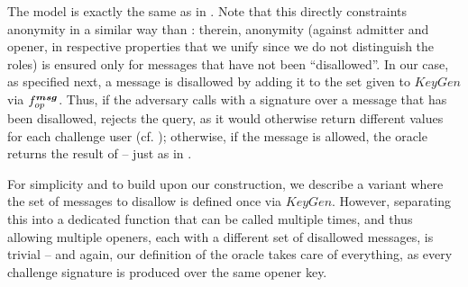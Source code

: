 The model is exactly the same as in
. Note that this directly constraints anonymity in a
similar way than \cite{ehk+19}: therein, anonymity (against admitter and opener,
in respective properties that we unify since we do not distinguish the roles) is
ensured only for messages that have not been ``disallowed''. In our case, as
specified next, a message is disallowed by adding it to the \smsg set given to
$KeyGen$ via $f_{op}^{\boldsymbol{msg}}$. Thus, if the adversary calls  with a
signature over a message that has been disallowed,  rejects the
query, as it would otherwise return different values for each challenge user
(cf. ); otherwise, if the message is allowed, the oracle
returns the result of \Open -- just as in \cite{ehk+19}.

For simplicity and to build upon our \CUASGS construction, we
describe a variant where the set of messages to disallow is defined once via
$KeyGen$. However, separating this into a dedicated \OKeyGen function that can
be called multiple times, and thus allowing multiple openers, each with a
different set of disallowed messages, is trivial -- and again, our definition
of the  oracle takes care of everything, as every challenge
signature is produced over the same opener key.

      
      
